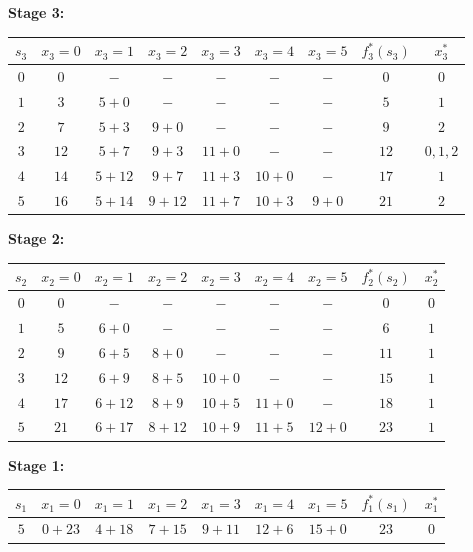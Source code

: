 \documentclass{article}[12pt,a4paper]
\begin{document}
\begin{enumerate}
    \textbf{Stage 3:}
   \begin{center}
   \begin{tabular}{c | c c c c c c | c | c}
   $s_3$ & $x_3 = 0$ & $x_3 = 1$ & $x_3 = 2$ &$x_3 = 3$ & $x_3 = 4$ & $x_3 = 5$ & $f^*_3(s_3)$ & $x^*_3$ \\
   \hline
   $0$ & $0$ & $-$ & $-$ & $-$ & $-$ & $-$ & $0$ & $0$ \\
   $1$ & $3$ & $5 + 0$ & $-$ & $-$ & $-$ & $-$ & $5$ & $1$  \\
   $2$ & $7$ & $5 + 3$ & $9 + 0$ & $-$ & $-$ & $-$ & $9$ & $2$ \\
   $3$ & $12$ & $5 + 7$ & $9 + 3$ & $11 + 0$ & $-$ & $-$ & $12$ & $0,1,2$ \\
   $4$ & $14$ & $5 + 12$ & $9 + 7$ & $11 + 3$ & $10 + 0$ & $-$ & $17$ & $1$ \\
   $5$ & $16$ & $5 + 14$ & $9 + 12$ & $11 + 7$ & $10 + 3$ & $9 + 0$ & $21$ & $2$ \\
   \end{tabular}
   \end{center}
   
   \textbf{Stage 2:}
   \begin{center}
   \begin{tabular}{c | c c c c c c | c | c}
   $s_2$ & $x_2 = 0$ & $x_2 = 1$ & $x_2 = 2$ &$x_2 = 3$ & $x_2 = 4$ & $x_2 = 5$ & $f^*_2(s_2)$ & $x^*_2$ \\
   \hline
   $0$ & $0$ & $-$ & $-$ & $-$ & $-$ & $-$ & $0$ & $0$ \\
   $1$ & $5$ & $6 + 0$ & $-$ & $-$ & $-$ & $-$ & $6$ & $1$  \\
   $2$ & $9$ & $6 + 5$ & $8 + 0$ & $-$ & $-$ & $-$ & $11$ & $1$ \\
   $3$ & $12$ & $6 + 9$ & $8 + 5$ & $10 + 0$ & $-$ & $-$ & $15$ & $1$ \\
   $4$ & $17$ & $6 + 12$ & $8 + 9$ & $10 + 5$ & $11 + 0$ & $-$ & $18$ & $1$ \\
   $5$ & $21$ & $6 + 17$ & $8 + 12$ & $10 + 9$ & $11 + 5$ & $12 + 0$ & $23$ & $1$ \\
   \end{tabular}
   \end{center}
   
   \textbf{Stage 1:}
   \begin{center}
   \begin{tabular}{c | c c c c c c | c | c}
   $s_1$ & $x_1 = 0$ & $x_1 = 1$ & $x_1 = 2$ &$x_1 = 3$ & $x_1 = 4$ & $x_1 = 5$ & $f^*_1(s_1)$ & $x^*_1$ \\
   \hline
   $5$ & $0 + 23$ & $4 + 18$ & $7 + 15$ & $9 + 11$ & $12 + 6$ & $15 + 0$ & $23$ & $0$ \\
   \end{tabular}
   \end{center}
  

\end{enumerate}
\end{document}
